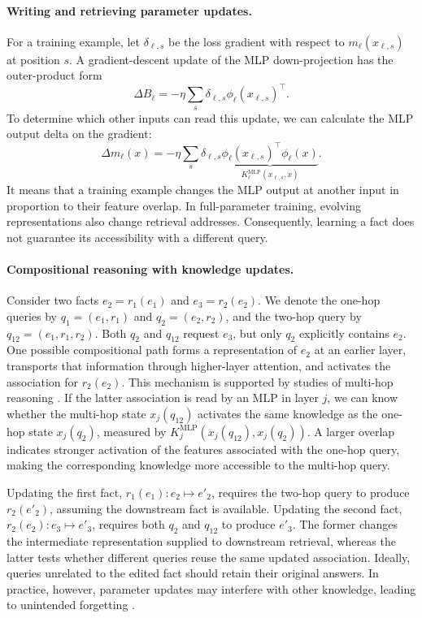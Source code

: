 \paragraph{Writing and retrieving parameter updates.}
For a training example, let $\delta_{\ell,s}$ be the loss gradient
with respect to $m_\ell(x_{\ell,s})$ at position $s$.
A gradient-descent update of the MLP down-projection has the outer-product form
\begin{equation}
 \Delta B_\ell=-\eta\sum_s
 \delta_{\ell,s}\phi_\ell(x_{\ell,s})^{\top}.
 \label{eq:assoc_write}
\end{equation}
To determine which other inputs can read this update, we can calculate the MLP output delta on the gradient:
\begin{equation}
 \Delta m_\ell(x)
 =-\eta\sum_s\delta_{\ell,s}
 \underbrace{\phi_\ell(x_{\ell,s})^{\top}\phi_\ell(x)}
 _{K_\ell^{\mathrm{MLP}}(x_{\ell,s},x)}.
 \label{eq:assoc_transfer}
\end{equation}
It means that a training example changes the MLP output at another input in
proportion to their feature overlap.  In full-parameter training, evolving representations also change retrieval addresses.
Consequently, learning a fact does not guarantee its accessibility with a different query.

\paragraph{Compositional reasoning with knowledge updates.}
Consider two facts $e_2=r_1(e_1)$ and $e_3=r_2(e_2)$.
We denote the one-hop queries by $q_1=(e_1,r_1)$ and
$q_2=(e_2,r_2)$, and the two-hop query by
$q_{12}=(e_1,r_1,r_2)$. Both $q_2$ and $q_{12}$ request $e_3$,
but only $q_2$ explicitly contains $e_2$.
One possible compositional path forms a representation of $e_2$ at an
earlier layer, transports that information through
higher-layer attention, and activates
the association for $r_2(e_2)$. This mechanism is supported by studies of multi-hop reasoning
\citep{wang2024grokked,biran2024hopping}. 
If the latter association is read by an MLP in layer $j$, we can know whether the multi-hop state $x_j(q_{12})$ activates the same knowledge as the one-hop state $x_j(q_2)$, measured by $K_j^{\mathrm{MLP}}(x_j(q_{12}),x_j(q_2))$. A larger overlap indicates stronger activation of the features associated with the one-hop query, making the corresponding knowledge more accessible to the multi-hop query.

Updating the first fact, $r_1(e_1):e_2\mapsto e'_2$, requires the
two-hop query to produce $r_2(e'_2)$, assuming the downstream fact is
available. Updating the second fact, $r_2(e_2):e_3\mapsto e'_3$,
requires both $q_2$ and $q_{12}$ to produce $e'_3$.
The former changes the
intermediate representation supplied to downstream retrieval, whereas
the latter tests whether different queries reuse the same updated
association. Ideally, queries unrelated to the edited fact should retain their original answers. In practice, however, parameter updates may interfere with other knowledge, leading to unintended forgetting \citep{zhong2023mquake,cohen2023evaluatingrippleeffectsknowledge}.

